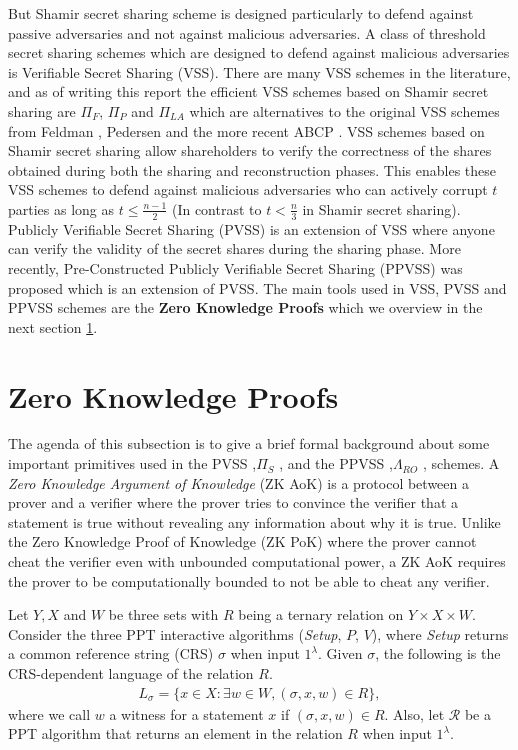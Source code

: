 But Shamir secret sharing scheme is designed particularly to defend against passive adversaries and not 
against malicious adversaries. A class of threshold secret sharing schemes which are designed to defend 
against malicious adversaries is Verifiable Secret Sharing (VSS). There are many VSS schemes in the literature, 
and as of writing this report the efficient VSS schemes based on Shamir secret sharing are $\Pi_F$, 
$\Pi_P$ and $\Pi_{LA}$ \cite{cryptoeprint:2023/1669} which are alternatives to the original VSS schemes 
from Feldman \cite{DBLP:conf/focs/Feldman87}, Pedersen \cite{crypto-1991-1671} and the more recent 
ABCP \cite{cryptoeprint:2023/992}. VSS schemes based on Shamir secret sharing allow shareholders to 
verify the correctness of the shares obtained during both the sharing and reconstruction phases. This enables 
these VSS schemes to defend against malicious adversaries who can actively corrupt $t$ parties as long as 
$t\leq\frac{n-1}{2}$ (In contrast to $t<\frac{n}{3}$ in Shamir secret sharing). Publicly Verifiable Secret Sharing (PVSS) is an extension of VSS where anyone can 
verify the validity of the secret shares during the sharing phase. More recently, Pre-Constructed Publicly 
Verifiable Secret Sharing (PPVSS)\cite{cryptoeprint:2025/576} was proposed which is an extension of PVSS. 
The main tools used in VSS, PVSS and PPVSS schemes are the \textbf{Zero Knowledge Proofs} which we overview in the 
next section \ref{sec:sigma-protocols}.

\section{Zero Knowledge Proofs}
\label{sec:sigma-protocols}
The agenda of this subsection is to give a brief formal background about some important primitives 
used in the PVSS ,$\Pi_S$ \cite{cryptoeprint:2023/1669}, and the PPVSS ,$\Lambda_{RO}$ \cite{cryptoeprint:2025/576}, schemes. 
A \textit{Zero Knowledge Argument of Knowledge} (ZK AoK)\cite{cryptoeprint:2017/1066} is a protocol between a prover and a verifier
where the prover tries to convince the verifier that a statement is true without revealing any information 
about why it is true. Unlike the Zero Knowledge Proof of Knowledge (ZK PoK) where the prover cannot cheat 
the verifier even with unbounded computational power, a ZK AoK requires the prover to be computationally bounded 
to not be able to cheat any verifier.\par
Let $Y,X$ and $W$ be three sets with $R$ being a ternary relation on $Y\times X\times W$. Consider the 
three PPT interactive algorithms (\textit{Setup}, $P$, $V$), where \textit{Setup} returns a 
common reference string (CRS) $\sigma$ when input $1^{\lambda}$. Given $\sigma$, the following 
is the CRS-dependent language of the relation $R$.
\begin{align*}
  L_{\sigma}=\{x\in X :\exists w\in W, (\sigma, x, w)\in R\},
\end{align*}
where we call $w$ a witness for a statement $x$ if $(\sigma, x, w)\in R$. Also, let $\mathcal{R}$ be 
a PPT algorithm that returns an element in the relation $R$ when input $1^{\lambda}$.\par

